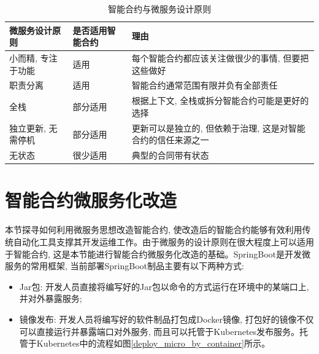 {\footnotesize
\begin{longtable}[h]{m{100pt} m{100pt} m{150pt}}
    \caption[智能合约与微服务设计原则]{智能合约与微服务设计原则\cite{weber2018blockchain}} \label{Microservices_and_Smart_contract_Design_Principle} \\
        \toprule  
        \textbf{微服务设计原则}&\textbf{是否适用智能合约}&\textbf{理由} \\
        \hline
        小而精, 专注于功能 & 适用 & 每个智能合约都应该关注做很少的事情, 但要把这些做好  \\

        职责分离 & 适用 & 智能合约通常范围有限并负有全部责任 \\

        全栈 & 部分适用 & 根据上下文, 全栈或拆分智能合约可能是更好的选择 \\

        独立更新, 无需停机 & 部分适用 & 更新可以是独立的, 但依赖于治理, 这是对智能合约的信任来源之一 \\

        无状态 & 很少适用 & 典型的合同带有状态\\
        \bottomrule
    \end{longtable}
}

\section{智能合约微服务化改造}\label{section: smart_contract_micro}

本节探寻如何利用微服务思想改造智能合约, 使改造后的智能合约能够有效利用传统自动化工具支撑其开发运维工作。由于微服务的设计原则在很大程度上可以适用于智能合约, 这是本节能进行智能合约微服务化改造的基础。SpringBoot\footnotemark[1]是开发微服务的常用框架, 当前部署SpringBoot制品主要有以下两种方式:

\begin{itemize}[itemindent=2em]
    \item Jar包: 开发人员直接将编写好的Jar包以命令的方式运行在环境中的某端口上, 并对外暴露服务;

    \item 镜像发布: 开发人员将编写好的软件制品打包成Docker镜像, 打包好的镜像不仅可以直接运行并暴露端口对外服务, 而且可以托管于Kubernetes发布服务。托管于Kubernetes中的流程如图\ref{deploy_micro_by_container}所示。

\end{itemize}


